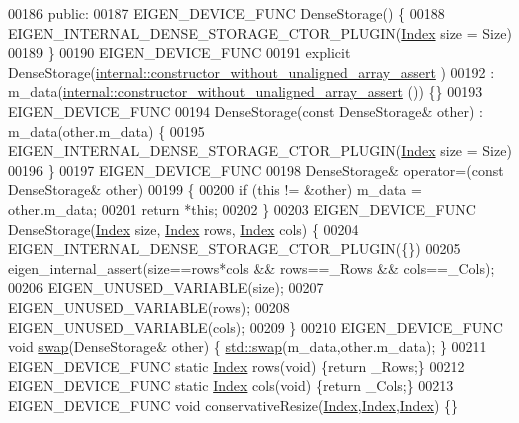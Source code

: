 \begin{DoxyCode}
00186   \textcolor{keyword}{public}:
00187     EIGEN\_DEVICE\_FUNC DenseStorage() \{
00188       EIGEN\_INTERNAL\_DENSE\_STORAGE\_CTOR\_PLUGIN(\hyperlink{namespace_eigen_a62e77e0933482dafde8fe197d9a2cfde}{Index} size = Size)
00189     \}
00190     EIGEN\_DEVICE\_FUNC
00191     \textcolor{keyword}{explicit} DenseStorage(\hyperlink{struct_eigen_1_1internal_1_1constructor__without__unaligned__array__assert}{internal::constructor\_without\_unaligned\_array\_assert}
      )
00192       : m\_data(\hyperlink{struct_eigen_1_1internal_1_1constructor__without__unaligned__array__assert}{internal::constructor\_without\_unaligned\_array\_assert}
      ()) \{\}
00193     EIGEN\_DEVICE\_FUNC 
00194     DenseStorage(\textcolor{keyword}{const} DenseStorage& other) : m\_data(other.m\_data) \{
00195       EIGEN\_INTERNAL\_DENSE\_STORAGE\_CTOR\_PLUGIN(\hyperlink{namespace_eigen_a62e77e0933482dafde8fe197d9a2cfde}{Index} size = Size)
00196     \}
00197     EIGEN\_DEVICE\_FUNC 
00198     DenseStorage& operator=(\textcolor{keyword}{const} DenseStorage& other)
00199     \{ 
00200       \textcolor{keywordflow}{if} (\textcolor{keyword}{this} != &other) m\_data = other.m\_data;
00201       \textcolor{keywordflow}{return} *\textcolor{keyword}{this}; 
00202     \}
00203     EIGEN\_DEVICE\_FUNC DenseStorage(\hyperlink{namespace_eigen_a62e77e0933482dafde8fe197d9a2cfde}{Index} size, \hyperlink{namespace_eigen_a62e77e0933482dafde8fe197d9a2cfde}{Index} rows, \hyperlink{namespace_eigen_a62e77e0933482dafde8fe197d9a2cfde}{Index} cols) \{
00204       EIGEN\_INTERNAL\_DENSE\_STORAGE\_CTOR\_PLUGIN(\{\})
00205       eigen\_internal\_assert(size==rows*cols && rows==\_Rows && cols==\_Cols);
00206       EIGEN\_UNUSED\_VARIABLE(size);
00207       EIGEN\_UNUSED\_VARIABLE(rows);
00208       EIGEN\_UNUSED\_VARIABLE(cols);
00209     \}
00210     EIGEN\_DEVICE\_FUNC \textcolor{keywordtype}{void} \hyperlink{endian_8c_a3ca5ecd34b04d6a243c054ac3a57f68d}{swap}(DenseStorage& other) \{ \hyperlink{endian_8c_a3ca5ecd34b04d6a243c054ac3a57f68d}{std::swap}(m\_data,other.m\_data); \}
00211     EIGEN\_DEVICE\_FUNC \textcolor{keyword}{static} \hyperlink{namespace_eigen_a62e77e0933482dafde8fe197d9a2cfde}{Index} rows(\textcolor{keywordtype}{void}) \{\textcolor{keywordflow}{return} \_Rows;\}
00212     EIGEN\_DEVICE\_FUNC \textcolor{keyword}{static} \hyperlink{namespace_eigen_a62e77e0933482dafde8fe197d9a2cfde}{Index} cols(\textcolor{keywordtype}{void}) \{\textcolor{keywordflow}{return} \_Cols;\}
00213     EIGEN\_DEVICE\_FUNC \textcolor{keywordtype}{void} conservativeResize(\hyperlink{namespace_eigen_a62e77e0933482dafde8fe197d9a2cfde}{Index},\hyperlink{namespace_eigen_a62e77e0933482dafde8fe197d9a2cfde}{Index},\hyperlink{namespace_eigen_a62e77e0933482dafde8fe197d9a2cfde}{Index}) \{\}

\end{DoxyCode}
